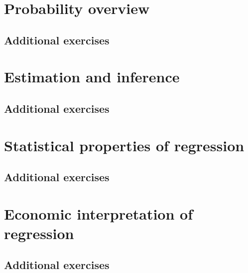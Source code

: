 \documentclass[12pt,notitlepage]{report}
\begin{document}
\part{Probability overview}




\chapter*{Additional exercises}


\part{Estimation and inference}






\newcommand*\FancyVerbStartString{## block}


\chapter*{Additional exercises}


\part{Statistical properties of regression}







\chapter*{Additional exercises}


\part{Economic interpretation of regression}


\chapter*{Additional exercises}

\end{document}
